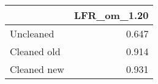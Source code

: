\begin{tabular}{lr}
\toprule
{} & LFR_om_1.20 \\
\midrule
Uncleaned   &       0.647 \\
Cleaned old &       0.914 \\
Cleaned new &       0.931 \\
\bottomrule
\end{tabular}
